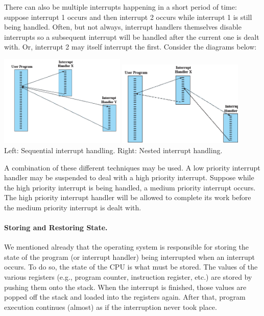 There can also be multiple interrupts happening in a short period of time: suppose interrupt 1 occurs and then interrupt 2 occurs while interrupt 1 is still being handled. Often, but not always, interrupt handlers themselves disable interrupts so a subsequent interrupt will be handled after the current one is dealt with. Or, interrupt 2 may itself interrupt the first. Consider the diagrams below:

\begin{center}
\includegraphics[width=0.45\textwidth]{images/interrupts-sequential.png}
\includegraphics[width=0.45\textwidth]{images/interrupts-nested.png}\\
Left: Sequential interrupt handling. Right: Nested interrupt handling.~\cite{osi}
\end{center}

A combination of these different techniques may be used. A low priority interrupt handler may be suspended to deal with a high priority interrupt. Suppose while the high priority interrupt is being handled, a medium priority interrupt occurs. The high priority interrupt handler will be allowed to complete its work before the medium priority interrupt is dealt with.


\paragraph{Storing and Restoring State.} We mentioned already that the operating system is responsible for storing the state of the program (or interrupt handler) being interrupted when an interrupt occurs. To do so, the state of the CPU is what must be stored. The values of the various registers (e.g., program counter, instruction register, etc.) are stored by pushing them onto the stack. When the interrupt is finished, those values are popped off the stack and loaded into the registers again. After that, program execution continues (almost) as if the interruption never took place.

